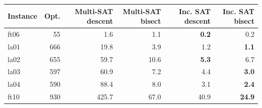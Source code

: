 \begin{tabular}{lrrrrr}
\toprule
Instance & Opt. & Multi-SAT descent & Multi-SAT bisect & Inc. SAT descent & Inc. SAT bisect \\
\midrule
ft06 & 55 & 1.6 & 1.1 & \textbf{0.2} & 0.2 \\
la01 & 666 & 19.8 & 3.9 & 1.2 & \textbf{1.1} \\
la02 & 655 & 59.7 & 10.6 & \textbf{5.3} & 6.7 \\
la03 & 597 & 60.9 & 7.2 & 4.4 & \textbf{3.0} \\
la04 & 590 & 88.4 & 8.0 & 3.1 & \textbf{2.4} \\
ft10 & 930 & 425.7 & 67.0 & 40.9 & \textbf{24.9} \\
\bottomrule
\end{tabular}
